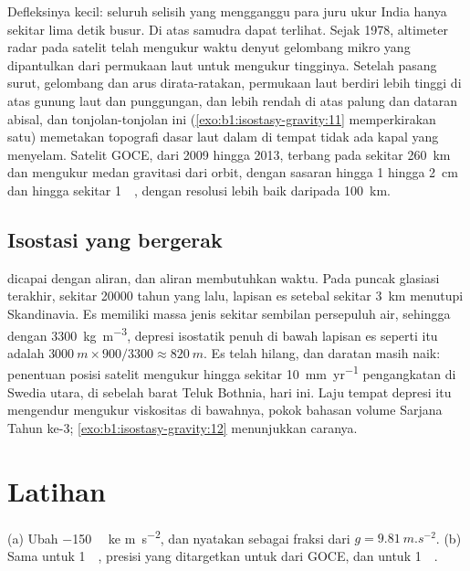 Defleksinya kecil: seluruh selisih yang mengganggu para juru ukur India hanya sekitar lima detik busur. Di atas samudra  dapat terlihat.
Sejak 1978, altimeter radar pada satelit telah mengukur waktu denyut gelombang mikro yang dipantulkan dari permukaan laut untuk mengukur tingginya. Setelah pasang surut, gelombang dan arus dirata-ratakan, permukaan laut berdiri lebih tinggi di atas gunung laut dan punggungan, dan lebih rendah di atas palung dan dataran abisal, dan tonjolan-tonjolan ini (\cref{exo:b1:isostasy-gravity:11} memperkirakan satu) memetakan topografi dasar laut dalam di tempat tidak ada kapal yang menyelam. Satelit GOCE, dari 2009 hingga 2013, terbang pada sekitar \qty{260}{km} dan mengukur medan gravitasi dari orbit, dengan sasaran  hingga 1 hingga
\qty{2}{cm} dan  hingga sekitar \qty{1}{\milli\gal}, dengan resolusi lebih baik daripada \qty{100}{km}.

\subsection*{Isostasi yang bergerak}

 dicapai dengan aliran, dan aliran membutuhkan waktu. Pada puncak glasiasi terakhir, sekitar \num{20000} tahun yang lalu, lapisan es setebal sekitar \qty{3}{km} menutupi Skandinavia.
Es memiliki massa jenis sekitar sembilan persepuluh air, sehingga dengan  \qty{3300}{kg.m^{-3}}, depresi isostatik penuh di bawah lapisan es seperti itu adalah
$\qty{3000}{m}\times900/3300 \approx \qty{820}{m}$. Es telah hilang, dan daratan masih naik: penentuan posisi satelit mengukur hingga sekitar \qty{10}{mm.yr^{-1}} pengangkatan di Swedia utara, di sebelah barat Teluk Bothnia, hari ini. Laju
tempat depresi itu mengendur mengukur viskositas  di bawahnya, pokok bahasan volume Sarjana Tahun ke-3; \cref{exo:b1:isostasy-gravity:12} menunjukkan caranya.

\section{Latihan}

\begin{exercise}[$\star$]\label{exo:b1:isostasy-gravity:1}
(a) Ubah  \qty{-150}{\milli\gal} ke \unit{m.s^{-2}}, dan nyatakan sebagai fraksi dari $g = \qty{9.81}{m.s^{-2}}$. (b) Sama untuk \qty{1}{\milli\gal}, presisi yang ditargetkan untuk  dari GOCE, dan untuk \qty{1}{\micro\gal}.
\end{exercise}

